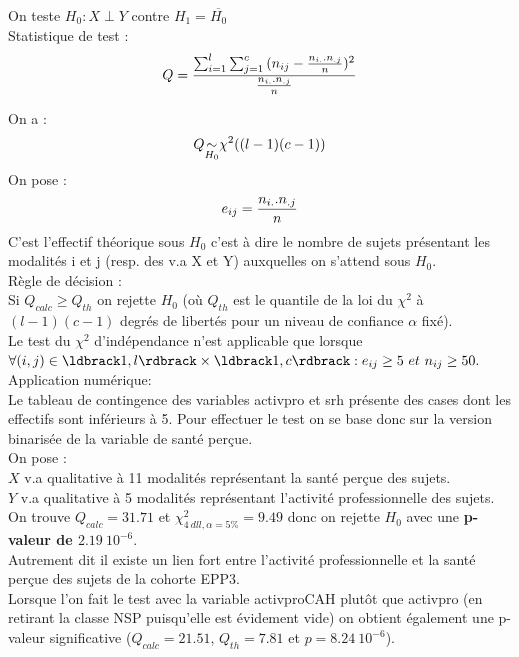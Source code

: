 \documentclass{book}
\begin{document}
\noindent
On teste $H_0 : X \perp Y $ contre $H_1 = \overline{H_0}$\\

\noindent
Statistique de test : 
\begin{align*}
Q = {\sum _{i = 1} ^l \sum_{j = 1} ^c {{(n_{ij} - {{n_{i.}.n_{.j}}\over{n}})^2}} \over {{n_{i.}.n_{.j}}\over{n}}}
\end{align*}

\noindent
On a : \\
\begin{align*}
Q \underset {\small{H_0}}{\large{\sim}} \chi ^{2} ((l-1)(c-1))
\end{align*}
\noindent
On pose :\\
\begin{align*}
e_{ij} = { {n_{i.}.n_ {.j} } \over {n} }
\end{align*}
C'est l'effectif théorique sous $H_0$ c'est à dire le nombre de sujets présentant les modalités i et j (resp. des v.a X et Y) auxquelles on s'attend sous $H_0$.\\

\noindent
Règle de décision :\\
Si $Q_{calc} \geq Q_{th}$ on rejette $H_0$ (où $Q_{th}$ est le quantile de la loi du $\chi ^2$ à $(l-1)(c-1)$ degrés de libertés pour un niveau de confiance $\alpha$ fixé).\\

\noindent
Le test du $\chi ^2$ d'indépendance n'est applicable que lorsque $\forall (i,j) \in \ldbrack 1,l \rdbrack \times \ldbrack 1,c \rdbrack : e_{ij} \geq 5 ~et ~n_{ij} \geq 50.$\\

\noindent
Application numérique:\\
Le tableau de contingence des variables activpro et srh présente des cases dont les effectifs sont inférieurs à 5. Pour effectuer le test on se base donc sur la version binarisée de la variable de santé perçue.\\

\noindent
On pose :\\
\noindent
$X$ v.a qualitative à 11 modalités représentant la santé perçue des sujets.\\
\noindent
$Y$ v.a qualitative à 5 modalités représentant l'activité professionnelle des sujets.\\

\noindent
On trouve $Q_{calc} = 31.71$ et $\chi ^2 _ {4 ~dll, \alpha = 5 \%} = 9.49$ donc on rejette $H_0$ avec une \textbf{p-valeur de $2.19 ~10^{-6}$}.\\
Autrement dit il existe un lien fort entre l'activité professionnelle et la santé perçue des sujets de la cohorte EPP3.\\
\noindent
Lorsque l'on fait le test avec la variable activproCAH plutôt que activpro (en retirant la classe NSP puisqu'elle est évidement vide) on obtient également une p-valeur significative ($Q_{calc} = 21.51$, $Q_{th} = 7.81$ et $p= 8.24 ~10^{-6}$).
\end{document}
